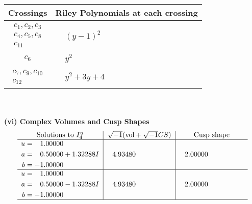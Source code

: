 \documentclass[1p]{elsarticle_modified}
\theoremstyle{definition}
\newcommand{\I}{\sqrt{-1}}
\begin{document}
\begin{tabular}{m{50pt}|m{274pt}}
Crossings & \hspace{64pt}Riley Polynomials at each crossing \\
\hline $$\begin{aligned}c_{1},c_{2},c_{3}\\c_{4},c_{5},c_{8}\\c_{11}\end{aligned}$$&$\begin{aligned}
&(y-1)^2
\end{aligned}$\\
\hline $$\begin{aligned}c_{6}\end{aligned}$$&$\begin{aligned}
&y^2
\end{aligned}$\\
\hline $$\begin{aligned}c_{7},c_{9},c_{10}\\c_{12}\end{aligned}$$&$\begin{aligned}
&y^2+3 y+4
\end{aligned}$\\
\hline
\end{tabular}\\~\\
\newpage\flushleft \textbf{(vi) Complex Volumes and Cusp Shapes}
$$\begin{array}{c|c|c}  
\text{Solutions to }I^u_{4}& \I (\text{vol} + \sqrt{-1}CS) & \text{Cusp shape}\\
 \hline 
\begin{aligned}
u &= \phantom{-}1.00000\phantom{ +0.000000I} \\
a &= \phantom{-}0.50000 + 1.32288 I \\
b &= -1.00000\phantom{ +0.000000I}\end{aligned}
 & \phantom{-}4.93480\phantom{ +0.000000I} & \phantom{-}2.00000\phantom{ +0.000000I} \\ \hline\begin{aligned}
u &= \phantom{-}1.00000\phantom{ +0.000000I} \\
a &= \phantom{-}0.50000 - 1.32288 I \\
b &= -1.00000\phantom{ +0.000000I}\end{aligned}
 & \phantom{-}4.93480\phantom{ +0.000000I} & \phantom{-}2.00000\phantom{ +0.000000I}\\
 \hline 
 \end{array}$$\newpage\newpage\renewcommand{\arraystretch}{1}
\end{document}
